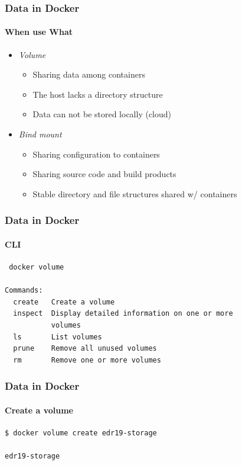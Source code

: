 
\begin{frame}[fragile]
\frametitle{Data in Docker}
\framesubtitle{When use What}

\begin{itemize}
\item \textit{Volume}
  \begin{itemize}
  \item Sharing data among containers
  \item The host lacks a directory structure
  \item Data can not be stored locally (cloud)
  \end{itemize}
\item \textit{Bind mount}
  \begin{itemize}
  \item Sharing configuration to containers
  \item Sharing source code and build products
  \item Stable directory and file structures shared w/ containers
  \end{itemize}
\end{itemize}
\end{frame}

\begin{frame}[fragile]
\frametitle{Data in Docker}
\framesubtitle{CLI}

\begin{lstlisting}
 docker volume

Commands:
  create   Create a volume
  inspect  Display detailed information on one or more
           volumes
  ls       List volumes
  prune    Remove all unused volumes
  rm       Remove one or more volumes
\end{lstlisting}
\end{frame}


\begin{frame}[fragile]
\frametitle{Data in Docker}
\framesubtitle{Create a volume}

\begin{lstlisting}
$ docker volume create edr19-storage

edr19-storage
\end{lstlisting}
\end{frame}

